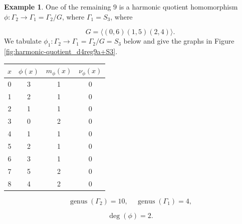 \documentclass[12pt,letterpaper]{article}
\theoremstyle{definition}
\newtheorem{example}[theorem]{Example}
\DeclareMathOperator{\genus}{genus}
\begin{document}
\begin{example}
{One of the remaining $9$ is a harmonic quotient homomorphism
$\phi: \Gamma_2\to \Gamma_1=\Gamma_2/G$,
where $\Gamma_1=S_3$, where

\[
G = \langle (0,6)(1,5)(2,4) \rangle.
\]
We tabulate $\phi_1: \Gamma_2\to \Gamma_1=\Gamma_2/G=S_3$
below and give the graphs in Figure \ref{fig:harmonic-quotient_d4reg9a+S3}.

\begin{center}
\begin{tabular}{c|c|c|c}  
  $x$ & $\phi(x)$ & $m_\phi(x)$ & $\nu_\phi(x)$ \\ \hline
  0   &    3   &        1         &  0   \\
  1   &    2   &        1         &  0   \\
  2   &    1   &        1         &  0   \\
  3   &    0   &        2         &  0   \\
  4   &    1   &        1         &  0   \\
  5   &    2   &        1         &  0   \\
  6   &    3   &        1         &  0   \\
  7   &    5   &        2         &  0   \\
  8   &    4   &        2         &  0   \\
\end{tabular}
\end{center}

\[
  \genus(\Gamma_2) =10,\ \ \ \ \
  \genus(\Gamma_1) =4,
\]

\[
\deg(\phi) =2.
\]

}
\end{example}
\end{document}
